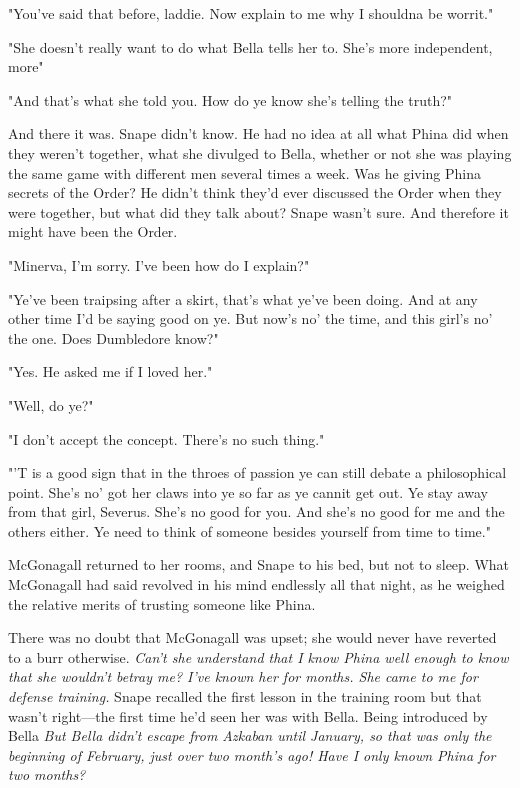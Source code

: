 "You've said that before, laddie. Now explain to me why I shouldna be worrit."

"She doesn't really want to do what Bella tells her to. She's more independent, more{\el}"

"And that's what she told you. How do ye know she's telling the truth?"

And there it was. Snape didn't know. He had no idea at all what Phina did when they weren't together, what she divulged to Bella, whether or not she was playing the same game with different men several times a week. Was he giving Phina secrets of the Order? He didn't think they'd ever discussed the Order when they were together, but what did they talk about? Snape wasn't sure. And therefore it might have been the Order.

"Minerva, I'm sorry. I've been{\el} how do I explain?"

"Ye've been traipsing after a skirt, that's what ye've been doing. And at any other time I'd be saying good on ye. But now's no' the time, and this girl's no' the one. Does Dumbledore know?"

"Yes. He asked me if I loved her."

"Well, do ye?"

"I don't accept the concept. There's no such thing."

"'T is a good sign that in the throes of passion ye can still debate a philosophical point. She's no' got her claws into ye so far as ye cannit get out. Ye stay away from that girl, Severus. She's no good for you. And she's no good for me and the others either. Ye need to think of someone besides yourself from time to time."

McGonagall returned to her rooms, and Snape to his bed, but not to sleep. What McGonagall had said revolved in his mind endlessly all that night, as he weighed the relative merits of trusting someone like Phina.

There was no doubt that McGonagall was upset; she would never have reverted to a burr otherwise. \emph{Can't she understand that I know Phina well enough to know that she wouldn't betray me? I've known her for months. She came to me for defense training.} Snape recalled the first lesson in the training room{\el} but that wasn't right—the first time he'd seen her was with Bella. Being introduced by Bella{\el} \emph{But Bella didn't escape from Azkaban until January, so that was only the beginning of February, just over two month's ago! Have I only known Phina for two months?}

